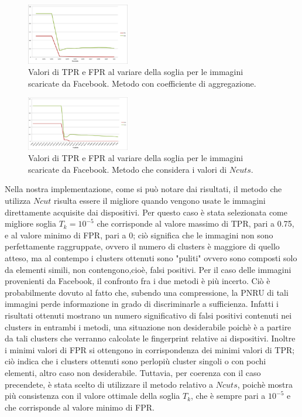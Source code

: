 \begin{figure}[h]
\begin{center}
\includegraphics[width=0.4\textwidth]{images/soglia_imgnat_fb_AC.png}
\end{center}
  \caption{Valori di TPR e FPR al variare della soglia per le immagini scaricate da Facebook. Metodo con coefficiente di aggregazione.}
\label{fig:soglia AC}
\end{figure}

\begin{figure}[h]
\begin{center}
\includegraphics[width=0.4\textwidth]{images/soglia_imgnat_fb_NC.png}
\end{center}
  \caption{Valori di TPR e FPR al variare della soglia per le immagini scaricate da Facebook. Metodo che considera i valori di $Ncuts$.}
\label{fig:soglia AC}
\end{figure}

Nella nostra implementazione, come si può notare dai risultati, il metodo che utilizza $Ncut$ risulta essere il migliore quando vengono usate le immagini direttamente acquisite dai dispositivi. Per questo caso è stata selezionata come migliore soglia $T_{k} = 10^{-5}$ che corrisponde al valore massimo di TPR, pari a 0.75, e al valore minimo di FPR, pari a 0; ciò significa che le immagini non sono perfettamente raggruppate, ovvero il numero di clusters è maggiore di quello atteso, ma al contempo i clusters ottenuti sono "puliti" ovvero sono composti solo da elementi simili, non contengono,cioè, falsi positivi.
Per il caso delle immagini provenienti da Facebook, il confronto fra i due metodi è più incerto. Ciò è probabilmente dovuto al fatto che, subendo una compressione, la PNRU di tali immagini perde informazione in grado di discriminarle a sufficienza. Infatti i risultati ottenuti mostrano un numero significativo di falsi positivi contenuti nei clusters in entrambi i metodi, una situazione non desiderabile poichè è a partire da tali clusters che verranno calcolate le fingerprint relative ai dispositivi. Inoltre i minimi valori di FPR si ottengono in corrispondenza dei minimi valori di TPR; ciò indica che i clusters ottenuti sono perlopiù cluster singoli o con pochi elementi, altro caso non desiderabile. Tuttavia, per coerenza con il caso precendete, è stata scelto di utilizzare il metodo relativo a $Ncuts$, poichè mostra più consistenza con il valore ottimale della soglia $T_{k}$, che è sempre pari a $10^{-5}$ e che corrisponde al valore minimo di FPR.

